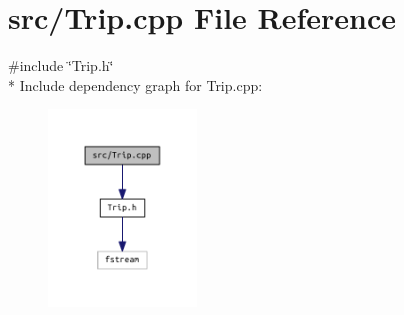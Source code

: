 \section{src/\+Trip.cpp File Reference}
\label{_trip_8cpp}
{\ttfamily \#include \char`\"{}Trip.\+h\char`\"{}}\\*
Include dependency graph for Trip.\+cpp\+:
\nopagebreak
\begin{figure}[H]
\begin{center}
\leavevmode
\includegraphics[width=112pt]{_trip_8cpp__incl}
\end{center}
\end{figure}
